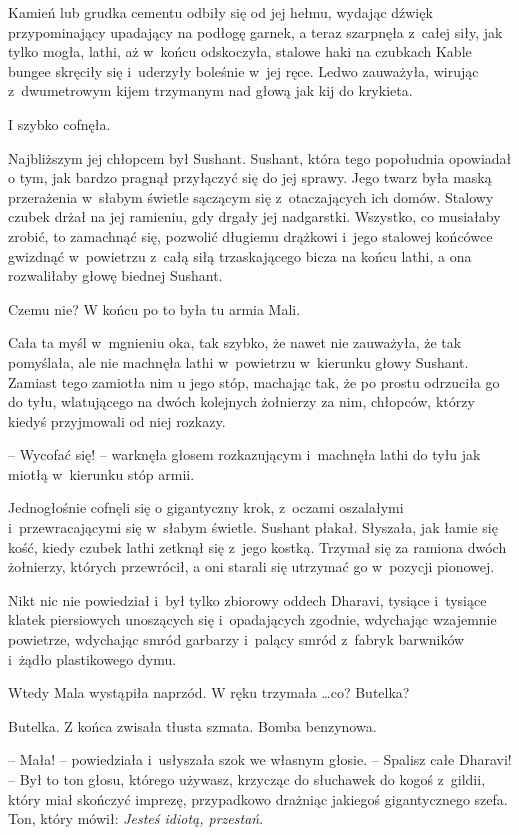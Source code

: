 \documentclass[oneside,polish,11pt,rmheadings]{mwbk}
\begin{document}
Kamień lub grudka cementu odbiły się od jej hełmu, wydając dźwięk przypominający upadający na podłogę garnek, a teraz szarpnęła z~całej siły, jak tylko mogła, lathi, aż w~końcu odskoczyła, stalowe haki na czubkach Kable bungee skręciły się i~uderzyły boleśnie w~jej ręce. Ledwo zauważyła, wirując z~dwumetrowym kijem trzymanym nad głową jak kij do krykieta.

I szybko cofnęła.

Najbliższym jej chłopcem był Sushant. Sushant, która tego popołudnia opowiadał o tym, jak bardzo pragnął przyłączyć się do jej sprawy. Jego twarz była maską przerażenia w~słabym świetle sączącym się z~otaczających ich domów. Stalowy czubek drżał na jej ramieniu, gdy drgały jej nadgarstki. Wszystko, co musiałaby zrobić, to zamachnąć się, pozwolić długiemu drążkowi i~jego stalowej końcówce gwizdnąć w~powietrzu z~całą siłą trzaskającego bicza na końcu lathi, a ona rozwaliłaby głowę biednej Sushant.

Czemu nie? W końcu po to była tu armia Mali.

Cała ta myśl w~mgnieniu oka, tak szybko, że nawet nie zauważyła, że tak pomyślała, ale nie machnęła lathi w~powietrzu w~kierunku głowy Sushant. Zamiast tego zamiotła nim u jego stóp, machając tak, że po prostu odrzuciła go do tyłu, wlatującego na dwóch kolejnych żołnierzy za nim, chłopców, którzy kiedyś przyjmowali od niej rozkazy.

-- Wycofać się! -- warknęła głosem rozkazującym i~machnęła lathi do tyłu jak miotłą w~kierunku stóp armii. 

Jednogłośnie cofnęli się o gigantyczny krok, z~oczami oszalałymi i~przewracającymi się w~słabym świetle. Sushant płakał. Słyszała, jak łamie się kość, kiedy czubek lathi zetknął się z~jego kostką. Trzymał się za ramiona dwóch żołnierzy, których przewrócił, a oni starali się utrzymać go w~pozycji pionowej.

Nikt nic nie powiedział i~był tylko zbiorowy oddech Dharavi, tysiące i~tysiące klatek piersiowych unoszących się i~opadających zgodnie, wdychając wzajemnie powietrze, wdychając smród garbarzy i~palący smród z~fabryk barwników i~żądło plastikowego dymu.

Wtedy Mala wystąpiła naprzód. W ręku trzymała \ldots  co? Butelka?

Butelka. Z końca zwisała tłusta szmata. Bomba benzynowa. 

-- Mała! -- powiedziała i~usłyszała szok we własnym głosie. -- Spalisz całe Dharavi! -- Był to ton głosu, którego używasz, krzycząc do słuchawek do kogoś z~gildii, który miał skończyć imprezę, przypadkowo drażniąc jakiegoś gigantycznego szefa. Ton, który mówił: \textit{Jesteś idiotą, przestań}. 
\end{document}
